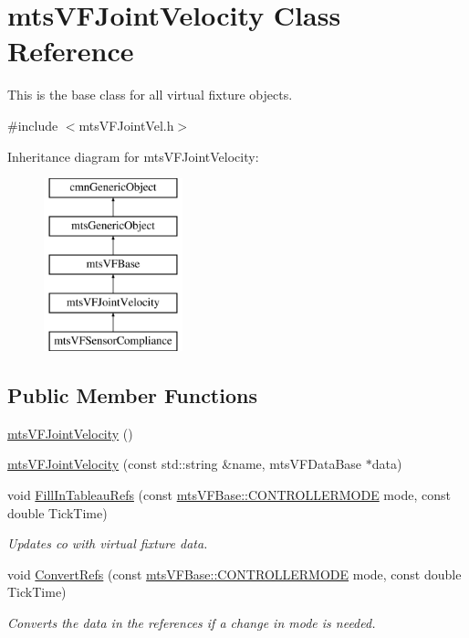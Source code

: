 \hypertarget{classmts_v_f_joint_velocity}{\section{mts\-V\-F\-Joint\-Velocity Class Reference}
\label{classmts_v_f_joint_velocity}
}


This is the base class for all virtual fixture objects.  




{\ttfamily \#include $<$mts\-V\-F\-Joint\-Vel.\-h$>$}

Inheritance diagram for mts\-V\-F\-Joint\-Velocity\-:\begin{figure}[H]
\begin{center}
\leavevmode
\includegraphics[height=5.000000cm]{dc/d56/classmts_v_f_joint_velocity}
\end{center}
\end{figure}
\subsection*{Public Member Functions}
\begin{DoxyCompactItemize}
\item 
\hyperlink{classmts_v_f_joint_velocity_ab74c3ef24c93b7d295bdc38bde7b22c0}{mts\-V\-F\-Joint\-Velocity} ()
\item 
\hyperlink{classmts_v_f_joint_velocity_a5fd0bf779c80b14765850d8110e139a5}{mts\-V\-F\-Joint\-Velocity} (const std\-::string \&name, mts\-V\-F\-Data\-Base $\ast$data)
\item 
void \hyperlink{classmts_v_f_joint_velocity_ad21528da274a3c6be0339306f23e5c31}{Fill\-In\-Tableau\-Refs} (const \hyperlink{classmts_v_f_base_a742dd08f8b70bafeb746cec14d9ee974}{mts\-V\-F\-Base\-::\-C\-O\-N\-T\-R\-O\-L\-L\-E\-R\-M\-O\-D\-E} mode, const double Tick\-Time)
\begin{DoxyCompactList}\small\item\em Updates co with virtual fixture data. \end{DoxyCompactList}\item 
void \hyperlink{classmts_v_f_joint_velocity_ab6c1d9afff46209d601a96dc0dd097c6}{Convert\-Refs} (const \hyperlink{classmts_v_f_base_a742dd08f8b70bafeb746cec14d9ee974}{mts\-V\-F\-Base\-::\-C\-O\-N\-T\-R\-O\-L\-L\-E\-R\-M\-O\-D\-E} mode, const double Tick\-Time)
\begin{DoxyCompactList}\small\item\em Converts the data in the references if a change in mode is needed. \end{DoxyCompactList}\end{DoxyCompactItemize}
